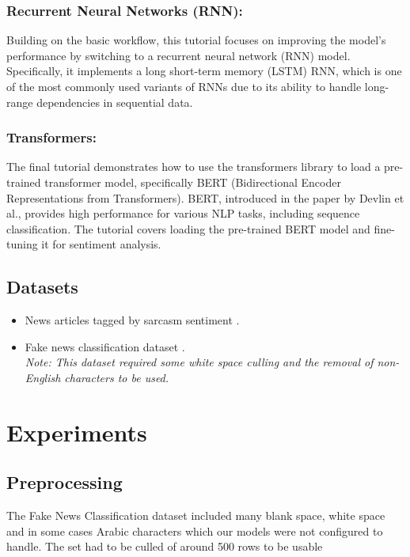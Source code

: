 \documentclass[11pt]{article}
\begin{document}
\subsubsection{Recurrent Neural Networks (RNN):}

Building on the basic workflow, this tutorial focuses on improving the model's performance by switching to a recurrent neural network (RNN) model. Specifically, it implements a long short-term memory (LSTM) RNN, which is one of the most commonly used variants of RNNs due to its ability to handle long-range dependencies in sequential data.

\subsubsection{Transformers:}

The final tutorial demonstrates how to use the transformers library to load a pre-trained transformer model, specifically BERT (Bidirectional Encoder Representations from Transformers). BERT, introduced in the paper by Devlin et al., provides high performance for various NLP tasks, including sequence classification. The tutorial covers loading the pre-trained BERT model and fine-tuning it for sentiment analysis.


\subsection{Datasets}

\begin{itemize}
    \item News articles tagged by sarcasm sentiment \cite{sarcasm-dataset}.
    \item Fake news classification dataset \cite{fake-news-dataset}. \\
          \textit{Note: This dataset required some white space culling and the removal of non-English characters to be used.}
\end{itemize}

\section{Experiments}

\subsection{Preprocessing}

The Fake News Classification dataset included many blank space, white space and in some cases Arabic characters which our models were not configured to handle. The set had to be culled of around 500 rows to be usable
\end{document}
